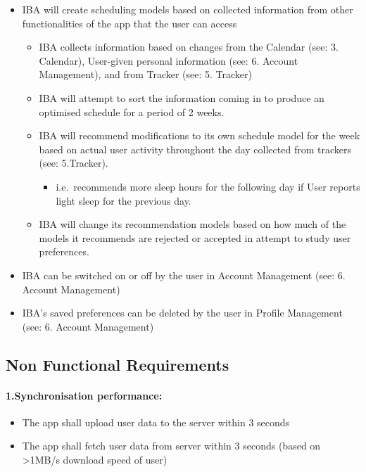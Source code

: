 \documentclass[a4paper,11pt]{article} %
\begin{document}
\begin{itemize}
\item
  IBA will create scheduling models based on collected information from
  other functionalities of the app that the user can access

  \begin{itemize}
  \item
    IBA collects information based on changes from the Calendar (see: 3.
    Calendar), User-given personal information (see: 6. Account
    Management), and from Tracker (see: 5. Tracker)
  \item
    IBA will attempt to sort the information coming in to produce an
    optimised schedule for a period of 2 weeks.
  \item
    IBA will recommend modifications to its own schedule model for the
    week based on actual user activity throughout the day collected from
    trackers (see: 5.Tracker).

    \begin{itemize}
    \item
      i.e.~recommends more sleep hours for the following day if User
      reports light sleep for the previous day.
    \end{itemize}
  \item
    IBA will change its recommendation models based on how much of the
    models it recommends are rejected or accepted in attempt to study
    user preferences.
  \end{itemize}
\item
  IBA can be switched on or off by the user in Account Management (see:
  6. Account Management)
\item
  IBA's saved preferences can be deleted by the user in Profile
  Management (see: 6. Account Management)
\end{itemize}

\hypertarget{non-functional-requirements}{%
\subsection{Non Functional
Requirements}\label{non-functional-requirements}}

\hypertarget{sync-perf}{%
\paragraph{1.Synchronisation performance:}\label{to-add}}

\begin{itemize}
\item
  The app shall upload user data to the server within 3 seconds
\item
  The app shall fetch user data from server within 3 seconds (based on
  \textgreater1MB/s download speed of user)
\end{itemize}
\end{document}
